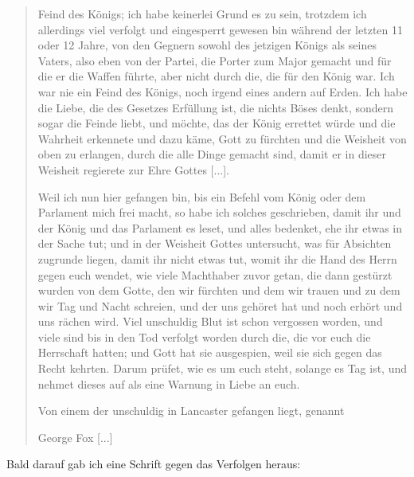 \begin{quote}
  Feind des Königs; ich habe keinerlei Grund es zu sein, trotzdem
  ich allerdings viel verfolgt und eingesperrt gewesen bin während
  der letzten 11 oder 12 Jahre, von den Gegnern sowohl des
  jetzigen Königs als seines Vaters, also eben von der Partei, die
  Porter zum Major gemacht und für die er die Waffen führte,
  aber nicht durch die, die für den König war. Ich war nie ein
  Feind des Königs, noch irgend eines andern auf Erden. Ich
  habe die Liebe, die des Gesetzes Erfüllung ist, die nichts Böses
  denkt, sondern sogar die Feinde liebt, und möchte, das der König
  errettet würde und die Wahrheit erkennete und dazu käme, Gott
  zu fürchten und die Weisheit von oben zu erlangen, durch die
  alle Dinge gemacht sind, damit er in dieser Weisheit regierete zur
  Ehre Gottes [...].

  \medskip 

  Weil ich nun hier gefangen bin, bis ein Befehl vom König
  oder dem Parlament mich frei macht, so habe ich solches geschrieben, 
  damit ihr und der König und das Parlament es
  leset, und alles bedenket, ehe ihr etwas in der Sache tut; und
  in der Weisheit Gottes untersucht, was für Absichten zugrunde 
  liegen, damit ihr nicht etwas tut, womit ihr die Hand
  des Herrn gegen euch wendet, wie viele Machthaber zuvor getan,
  die dann gestürzt wurden von dem Gotte, den wir fürchten und
  dem wir trauen und zu dem wir Tag und Nacht schreien, und
  der uns gehöret hat und noch erhört und uns rächen wird. Viel
  unschuldig Blut ist schon vergossen worden, und viele sind bis in
  den Tod verfolgt worden durch die, die vor euch die Herrschaft
  hatten; und Gott hat sie ausgespien, weil sie sich gegen das
  Recht kehrten. Darum prüfet, wie es um euch steht, solange es
  Tag ist, und nehmet dieses auf als eine Warnung in Liebe
  an euch.\grqq{}

  \medskip 

  Von einem der unschuldig in Lancaster gefangen liegt, genannt
  \begin{center}George Fox [...]\end{center}

\end{quote} \bigskip

Bald darauf gab ich eine Schrift gegen das Verfolgen heraus:


